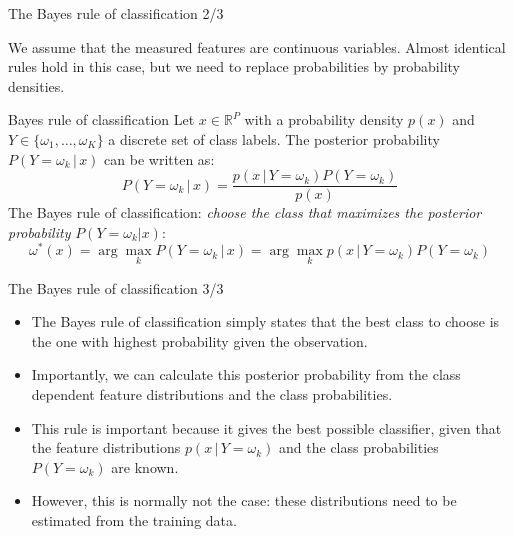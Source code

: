 \documentclass[xcolor=pdftex,dvipsnames,table]{beamer}
\begin{document}
\begin{frame}{The Bayes rule of classification 2/3}

We assume that the measured features are continuous variables. Almost identical rules hold in this case, but we need to replace probabilities by probability densities. 

\begin{block}{Bayes rule of classification}
	Let $x \in \mathbb{R}^P$ with a probability density $p(x)$ and $Y \in \{\omega_1, \ldots, \omega_K\}$ a discrete set of class labels. The posterior probability $P(Y=\omega_k\,|\,x)$ can be written as:
	\begin{equation}
		P(Y=\omega_k \, | \, x) = \frac{p(x \, | \, Y=\omega_k) P(Y=\omega_k)}{p(x)}
	\end{equation}
	The Bayes rule of classification: \emph{choose the class that maximizes the posterior probability} $P(Y=\omega_k|x)$:
	\begin{equation}
		\omega^{\ast}(x) = \arg\max_k P(Y=\omega_k \, | \, x) = \arg\max_k p(x\,|\,Y=\omega_k)P(Y=\omega_k)
	\end{equation}
\end{block}
	
\end{frame}


\begin{frame}{The Bayes rule of classification 3/3}

\begin{itemize}
\item The Bayes rule of classification simply states that the best class to choose is the one with highest probability given the observation.
\item Importantly, we can calculate this posterior probability from the class dependent feature distributions and the class probabilities. 
\item This rule is important because it gives the best possible classifier, given that the feature distributions $p(x\,|\,Y=\omega_k)$ and the class probabilities $P(Y=\omega_k)$ are known. 
\item However, this is normally not the case: these distributions need to be estimated from the training data.

\end{itemize}

\end{frame}
\end{document}
